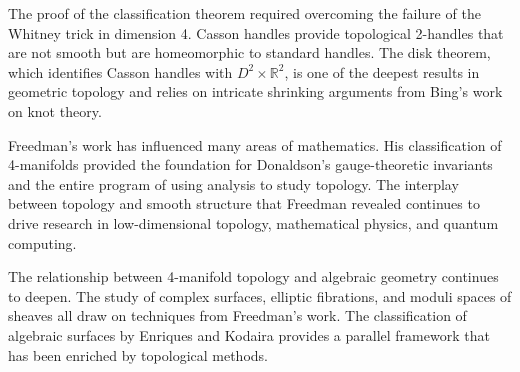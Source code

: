 The proof of the classification theorem required overcoming the failure of the Whitney trick in dimension 4. Casson handles provide topological 2-handles that are not smooth but are homeomorphic to standard handles. The disk theorem, which identifies Casson handles with $D^2 \times \mathbb{R}^2$, is one of the deepest results in geometric topology and relies on intricate shrinking arguments from Bing's work on knot theory.

Freedman's work has influenced many areas of mathematics. His classification of 4-manifolds provided the foundation for Donaldson's gauge-theoretic invariants and the entire program of using analysis to study topology. The interplay between topology and smooth structure that Freedman revealed continues to drive research in low-dimensional topology, mathematical physics, and quantum computing.

The relationship between 4-manifold topology and algebraic geometry continues to deepen. The study of complex surfaces, elliptic fibrations, and moduli spaces of sheaves all draw on techniques from Freedman's work. The classification of algebraic surfaces by Enriques and Kodaira provides a parallel framework that has been enriched by topological methods.
